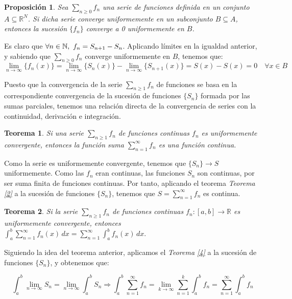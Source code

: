 \documentclass[11pt, a4paper]{article}
\makeatletter
\newif\IfInSansMode
\let\oldsf\sffamily
\renewcommand*{\sffamily}{\oldsf\mathversion{sans}\InSansModetrue}
\let\oldnorm\normalfont
\renewcommand*{\normalfont}{\oldnorm\InSansModefalse\mathversion{normal}}
\newcommand{\fn}{\{f_n\}}
\renewenvironment{proof}[1][\proofname] {\par\pushQED{\qed}\normalfont\topsep6\p@\@plus6\p@\relax\trivlist\item[\hskip\labelsep\itshape\sffamily#1\@addpunct{.}]\ignorespaces}{\popQED\endtrivlist\@endpefalse}
\theoremstyle{theorem-style}
\newtheorem{nth}{Teorema}[section]
\newtheorem{nprop}{Proposición}[section]
\theoremstyle{definition-style}
\theoremstyle{remark-style}
\theoremstyle{example-style}
\makeatother
\begin{document}
\begin{nprop}
  Sea $\sum_{n \ge 0} f_n$ una serie de funciones definida en un conjunto $A \subseteq \mathbb{R}^N$. Si dicha serie converge uniformemente en un subconjunto $B \subseteq A$, entonces la sucesión $\fn$ converge a 0 uniformemente en $B$.
\end{nprop}

  \begin{proof}
    Es claro que $\forall n \in \mathbb{N},\ f_n = S_{n+1} - S_n$. Aplicando límites en la igualdad anterior, y sabiendo que $\sum_{n\ge 0} f_n$ converge uniformemente en $B$, tenemos que: 
    $$\lim_{n \to \infty} \{f_n(x)\} = \lim_{n \to \infty} \{S_n(x)\} - \lim_{n \to \infty} \{S_{n + 1}(x)\} = S(x) - S(x) = 0\quad \forall x \in B$$
  \end{proof}

Puesto que  la convergencia de la serie $\sum_{n\geq 1} f_n$ de funciones se basa en la correspondiente convergencia de la sucesi\'on de funciones $\{S_n\}$ formada por las sumas parciales, tenemos una relación directa de la convergencia de series con la continuidad, derivación e integración.


\begin{nth} \label{7}
  Si una serie  $\sum_{n\geq 1} f_n $ de funciones continuas $f_n$ es uniformemente convergente, entonces la funci\'on suma $\displaystyle \sum_{n=1}^{\infty} f_n $ es una funci\'on continua.
\end{nth}

  \begin{proof}
    Como la serie es uniformemente convergente, tenemos que $\{S_n\} \to S$ uniformemente. Como las $f_n$ eran continuas, las funciones $S_n$ son continuas, por ser suma finita de funciones continuas. Por tanto, aplicando el teorema \textit{Teorema \ref{2}} a la sucesión de funciones $\{S_n\}$, tenemos que $S = \sum_{n=1}^{\infty} f_n$ es continua.
  \end{proof}


\begin{nth} \label{8}
  Si la serie $\sum_{n\geq 1} f_n $ de funciones continuas $f_n:[a,b]\longrightarrow \mathbb R$ es uniformemente convergente, entonces 
  $
  \displaystyle \int_a^b \sum_{n=1}^{\infty} f_n (x) \, dx =  \sum_{n=1}^{\infty} \int_a^b f_n (x) \, dx  .
  $
\end{nth}

  \begin{proof}
    Siguiendo la idea del teorema anterior, aplicamos el \textit{Teorema \ref{4}} a la sucesión de funciones $\{S_n\}$, y obtenemos que:

    $$\int_a^b \lim_{n \to \infty} S_n = \lim_{n \to \infty} \int_a^b S_n \Rightarrow \int_a^b \sum_{n=1}^{\infty} f_n = \lim_{k \to \infty} \sum_{n=1}^k \int_a^b f_n = \sum_{n =1}^{\infty} \int_a^b f_n$$
  \end{proof}
\end{document}
